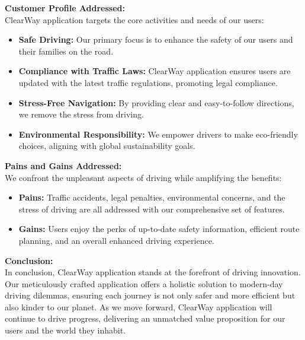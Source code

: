 \documentclass[12pt,a4paper]{article}
\begin{document}
\noindent \textbf{Customer Profile Addressed:}\\
\noindent ClearWay application targets the core activities and needs of our users:
\begin{itemize}
    \item \textbf{Safe Driving:} Our primary focus is to enhance the safety of our users and their families on the road.
    \item \textbf{Compliance with Traffic Laws:} ClearWay application ensures users are updated with the latest traffic regulations, promoting legal compliance.
    \item \textbf{Stress-Free Navigation:} By providing clear and easy-to-follow directions, we remove the stress from driving.
    \item \textbf{Environmental Responsibility:} We empower drivers to make eco-friendly choices, aligning with global sustainability goals.
\end{itemize}

 

\noindent \textbf{Pains and Gains Addressed:} \\
\noindent We confront the unpleasant aspects of driving while amplifying the benefits: 
\begin{itemize}
    \item \textbf{Pains:} Traffic accidents, legal penalties, environmental concerns, and the stress of driving are all addressed with our comprehensive set of features.
    \item \textbf{Gains:} Users enjoy the perks of up-to-date safety information, efficient route planning, and an overall enhanced driving experience.
\end{itemize}

\noindent \textbf{Conclusion:} \\
\noindent In conclusion, ClearWay application stands at the forefront of driving innovation. Our meticulously crafted application offers a holistic solution to modern-day driving dilemmas, ensuring each journey is not only safer and more efficient but also kinder to our planet. As we move forward, ClearWay application will continue to drive progress, delivering an unmatched value proposition for our users and the world they inhabit. \\




\pagebreak

\end{document}

